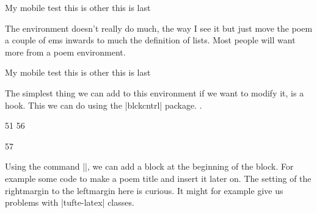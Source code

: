 \begin{teX}
\newenvironment{verse}
    {\let\\\@centercr(*@\protect\footnote{This is defined in ltmiscen.dtx}@*)
     \list{}{\itemsep  \z@
             \itemindent   -1.5em%
             \listparindent\itemindent
             \rightmargin  \leftmargin
             \advance\leftmargin 1.5em}%
       \item\relax}
    {\endlist}
\end{teX}
\makeatletter
\newenvironment{Verse}
    {\let\\\@centercr%
     \list{}{\itemsep1pt
             \itemindent-1.5em%
             \listparindent\itemindent
             \rightmargin\leftmargin
             \advance\leftmargin 1.5em}%
       \item\relax}
    {\endlist}
\makeatother
\begin{teX}
  \begin{Verse}
     My mobile test\\
     this is other\\
     this is last\\
  \end{Verse}
\end{teX}

The environment doesn't really do much, the way I see it but just move the poem a couple of ems inwards 
to much the definition of lists. Most people will want more from a poem environment.
\begin{Verse}
     My mobile test\\
      this is other\\
       this is last\\
\end{Verse}

The simplest thing we can add to this environment if we want to modify it, is a hook. This we can do using the |blckcntrl| package. .

\begin{teX}
\renewenvironment{verse}
50 {\let\\\@centercr
51 \relax{}%
56 \item\relax\PreVerse\relax}
57 {\endlist}
\end{teX}

Using the command |\PreVerse|, we can add a block at the beginning of the block. For example some code to make a poem title and insert it later on. The setting of the rightmargin to the leftmargin here is curious. It might for example give us problems with |tufte-latex| classes.


